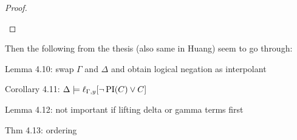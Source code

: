 \documentclass[,%
	paper=a4,%
	DIV14, 
	liststotoc,
	bibtotoc,
	draft=false,%
	numbers=noendperiod
]{scrartcl}
\newcommand{\lif}[1]{\lift{\Delta}{#1}{x}}
\begin{document}
\begin{proof}
\begin{description}
\begin{comment}
			by lemma 11 (huang)
			$\Gamma \entails [((\lif{s}=\lif{t} \land \lif{\PI(C_2)} ) \lor (\lif{s\neq t} \land \lif{\PI(C_1)})) \lor (\lif{D} \lor \lif{E[t]}) ]\sigma' $

			reformulate:
			$\Gamma \entails ((\lif{s}\sigma'=\lif{t}\sigma' \land \lif{\PI(C_2)}\sigma' ) \lor (\lif{s}\sigma'\neq \lif{t}\sigma' \land \lif{\PI(C_1)}\sigma')) \lor (\lif{D}\sigma' \lor \lif{E[t]}\sigma') $

			By the rule: $s\sigma = r\sigma$, hence also $\lif{s\sigma} = \lif{r\sigma}$ and $\lif{s}\sigma' = \lif{r}\sigma'$ REALLY TRUE? -- think so\dots

			Suppose $M \entails \Gamma$ and $M \not \entails (\lif{D}\sigma' \lor \lif{E[t]}\sigma') $.

			Suppose $M \entails \lif{s}\sigma' = \lif{t}\sigma'$.

			By induction hypothesis (and lemma 11 (huang) and adding the substitution $\sigma'$), 
			$\Gamma \entails \lif{\PI(C_2)}\sigma' \lor \lif{(E[r])}\sigma'$.

			However by assumption $\Gamma \not \entails \lif{E[t]}\sigma'$.

			Hence $\Gamma \not \entails \lif{E[s]}\sigma'$, and
			$\Gamma \not \entails \lif{E[r]}\sigma'$. Therefore $\Gamma \entails \lif{\PI(C_2)}\sigma'$.


			Suppose on the other hand $M \entails \lif{s}\sigma' \neq \lif{t}\sigma'$.

			By the induction hypothesis, 
			$M \entails \lif{\PI(C_1)}\sigma' \lor (\lif{D}\sigma'\lor (\lif{s}=\lif{t})\sigma')$,
			hence then $M \entails \lif{\PI(C_1)}\sigma'$.

			Consequently, 
			$M \entails (\lif{s}\sigma' \neq \lif{t}\sigma' \land \lif{\PI(C_1)}\sigma') \lor (\lif{s}\sigma' = \lif{t}\sigma' \land \lif{\PI(C_2)}\sigma')$.

			By lemma 11 (huang), 
			$M \entails \lif{s \neq {t} \land {\PI(C_1)} \lor ({s} = {t} \land \PI(C_2))}\sigma'$.

			Hence 
			$\Gamma \entails \lif{(s \neq {t} \land {\PI(C_1)} \lor ({s} = {t} \land \PI(C_2))}\sigma' \lor (\lif{D} \lor \lif{E[t]})\sigma') $.

			is this really what i need to show?
		\end{comment}
\end{description}
\end{proof}



Then the following from the thesis (also same in Huang) seem to go through:

Lemma 4.10: swap $\Gamma$ and $\Delta$ and obtain logical negation as interpolant 

Corollary 4.11: $\Delta \models \ell_{\Gamma,y}[ \lnot \operatorname{PI}(C) \lor C]$ 

Lemma 4.12: not important if lifting delta or gamma terms first 

Thm 4.13: ordering 
\end{document}
